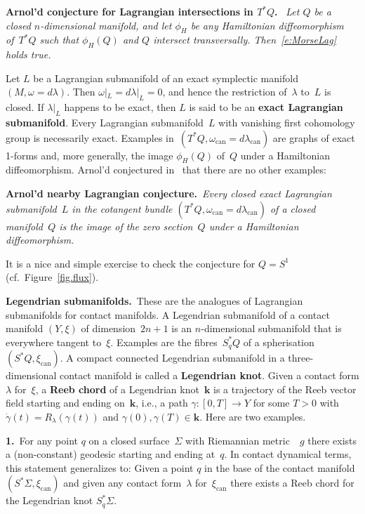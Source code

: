 \documentclass[12pt,twoside]{amsart}
\theoremstyle{plain}
\numberwithin{figure}{section}
\numberwithin{equation}{section}
\def\s{\smallskip}
\def\m{\medskip}
\def\can{\operatorname{can}}
\def\kk{\boldsymbol{k}}
\def\gg{\gamma}
\def\ni{\noindent}
\def\m{\medskip}
\begin{document}
\m \ni
{\bf Arnol'd conjecture for Lagrangian intersections in $T^*Q$.}\
{\it
Let $Q$ be a closed $n$-dimensional manifold, and let $\phi_H$ be any Hamiltonian diffeomorphism of~$T^*Q$ such that $\phi_H(Q)$ and $Q$ intersect transversally. 
Then~\eqref{e:MorseLag} holds true.}

\m 
Let $L$ be a Lagrangian submanifold of an exact symplectic manifold $(M,\omega=d\lambda)$. 
Then $\omega|_L=d\lambda|_L=0$, and hence the restriction of~$\lambda$ to~$L$ is closed. 
If $\lambda |_L$ happens to be exact, then $L$ is said to be an {\bf exact Lagrangian submanifold}. 
Every Lagrangian submanifold~$L$ with vanishing first cohomology group is necessarily exact.
%
Examples in~$(T^*Q,\omega_{\can}=d\lambda_{\can})$ are graphs of exact 1-forms and, more generally, 
the image $\phi_H (Q)$ of~$Q$ under a Hamiltonian diffeomorphism.
%
Arnol'd conjectured in~\cite{Arn86} that there are no other examples:

\m \ni
{\bf Arnol'd nearby Lagrangian conjecture.}\
{\it Every closed exact Lagrangian submanifold~$L$ in the cotangent bundle 
$(T^*Q,\omega_{\can}=d\lambda_{\can})$ of a closed manifold~$Q$ is the image of the zero section~$Q$ under a Hamiltonian diffeomorphism.}

\m
It is a nice and simple exercise to check the conjecture for $Q=S^1$
(cf.\ Figure~\ref{fig.flux}).

\m \ni
{\bf Legendrian submanifolds.}\
These are the analogues of Lagrangian submanifolds 
for contact manifolds. 
A Legendrian submanifold of a contact manifold $(Y,\xi)$ of dimension~$2n+1$ 
is an $n$-dimensional submanifold that is everywhere tangent to~$\xi$.
Examples are the fibres~$S_q^*Q$ of a spherisation $(S^*Q, \xi_{\can})$.
%
A compact connected Legendrian submanifold in a three-dimensional contact manifold
is called a {\bf Legendrian knot}.
%
Given a contact form $\lambda$ for~$\xi$, a {\bf Reeb chord}\/ of a Legendrian knot~$\kk$
is a trajectory of the Reeb vector field starting and ending on~$\kk$,
i.e., a path $\gg \colon [0,T] \to Y$ for some $T>0$ with $\dot \gg (t) = R_{\lambda}(\gg(t))$
and $\gg(0), \gg(T) \in \kk$.
% 
Here are two examples.

\s
{\bf 1.}\
For any point $q$ on a closed surface~$\Sigma$ with Riemannian metric~~$g$ 
there exists a (non-constant) geodesic starting and ending at~$q$.
In contact dynamical terms, this statement generalizes to:
Given a point $q$ in the base of the contact manifold $(S^* \Sigma, \xi_{\can})$
and given any contact form~$\lambda$ for~$\xi_{\can}$ there exists a Reeb chord for
the Legendrian knot $S_q^* \Sigma$.
\end{document}
